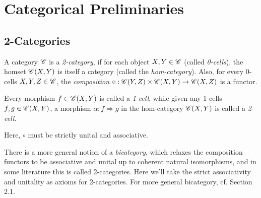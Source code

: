 \documentclass{article}
\begin{document}
\newpage

\section{Categorical Preliminaries}\label{sec_CatPrelim}
\subsection{2-Categories}\label{sub_2_cat}

\begin{defn}\label{defn_2_cat}
    A category $\mathscr{C}$ is a \emph{2-category}, if for each object $X,Y\in\mathscr{C}$ (called \emph{0-cells}), the homset $\mathscr{C}(X,Y)$ is itself a category (called the \emph{hom-category}). Also, for every 0-cells $X,Y,Z\in\mathscr{C}$, the \emph{composition} $\circ:\mathscr{C}(Y,Z)\times\mathscr{C}(X,Y)\rightarrow\mathscr{C}(X,Z)$ is a functor.

    Every morphism $f\in \mathscr{C}(X,Y)$ is called a \emph{1-cell}, while given any 1-cells $f,g\in\mathscr{C}(X,Y)$, a morphism $\alpha:f\Rightarrow g$ in the hom-category $\mathscr{C}(X,Y)$ is called a \emph{2-cell}.
\end{defn}

Here, $\circ$ must be strictly unital and associative.

\begin{rem}\label{rem_bicat}
    There is a more general notion of a \emph{bicategory}, which relaxes the composition functors to be associative and unital up to coherent natural isomorphisms, and in some literature this is called 2-categories. Here we'll take the strict associativity and unitality as axioms for 2-categories. For more general bicategory, cf. \cite{JY21} Section 2.1.
\end{rem}
\end{document}
